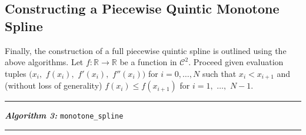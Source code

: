 \documentclass{scspaperproc}
\theoremstyle{scsthe}
\begin{document}
\subsection{Constructing a Piecewise Quintic Monotone Spline}
\label{monotone_spline}

Finally, the construction of a full piecewise quintic spline is outlined using the above algorithms. Let $f: \mathbb{R} \rightarrow \mathbb{R}$ be a function in $\mathcal{C}^2.$ Proceed given evaluation tuples $\big(x_i,$ $f(x_i),$ $f'(x_i),$ $f''(x_i)\big)$ for $i = 0,\ldots,N$ such that $x_i < x_{i+1}$ and (without loss of generality) $f(x_i) \leq f(x_{i+1})$ for $i = 1,$ $\ldots,$ $N-1$. 

\vspace{10pt}%
\hrule%
\vspace{3pt}%
\noindent\textbf{\textit{Algorithm 3:}} \texttt{monotone\_spline}%
\vspace{3pt}%
\hrule%
\end{document}
